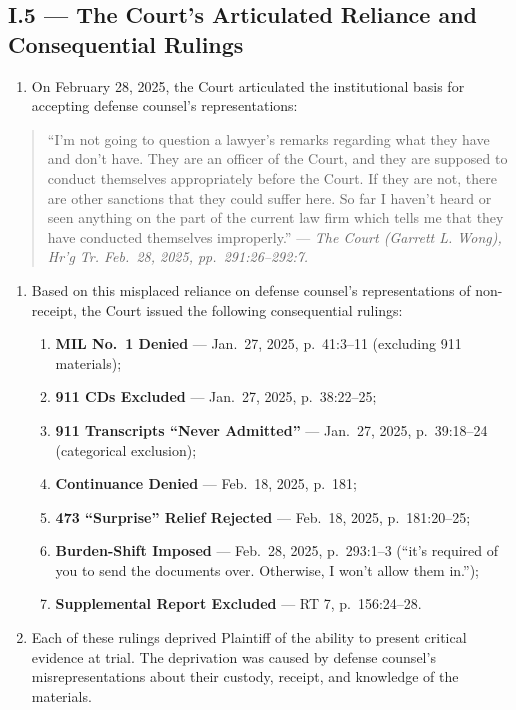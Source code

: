 \subsection{\textsection{}I.5 --- The Court's Articulated Reliance and Consequential Rulings}\label{i.5-the-courts-articulated-reliance-and-consequential-rulings}

\begin{enumerate}
\def\labelenumi{\arabic{enumi}.}
\setcounter{enumi}{3}
\tightlist
\item
  On February 28, 2025, the Court articulated the institutional basis for accepting defense counsel's representations:
\end{enumerate}

\begin{quote}
``I'm not going to question a lawyer's remarks regarding what they have and don't have. They are an officer of the Court, and they are supposed to conduct themselves appropriately before the Court. If they are not, there are other sanctions that they could suffer here. So far I haven't heard or seen anything on the part of the current law firm which tells me that they have conducted themselves improperly.'' --- \emph{The Court (Garrett L. Wong), Hr'g Tr. Feb.~28, 2025, pp.~291:26--292:7.}
\end{quote}

\begin{enumerate}
\def\labelenumi{\arabic{enumi}.}
\setcounter{enumi}{4}
\item
  Based on this misplaced reliance on defense counsel's representations of non-receipt, the Court issued the following consequential rulings:

  \begin{enumerate}
  \def\labelenumii{(\alph{enumii})}
  \item
    \textbf{MIL No.~1 Denied} --- Jan.~27, 2025, p.~41:3--11 (excluding 911 materials);
  \item
    \textbf{911 CDs Excluded} --- Jan.~27, 2025, p.~38:22--25;
  \item
    \textbf{911 Transcripts ``Never Admitted''} --- Jan.~27, 2025, p.~39:18--24 (categorical exclusion);
  \item
    \textbf{Continuance Denied} --- Feb.~18, 2025, p.~181;
  \item
    \textbf{\textsection{} 473 ``Surprise'' Relief Rejected} --- Feb.~18, 2025, p.~181:20--25;
  \item
    \textbf{Burden-Shift Imposed} --- Feb.~28, 2025, p.~293:1--3 (``it's required of you to send the documents over. Otherwise, I won't allow them in.'');
  \item
    \textbf{Supplemental Report Excluded} --- RT 7, p.~156:24--28.
  \end{enumerate}
\item
  Each of these rulings deprived Plaintiff of the ability to present critical evidence at trial. The deprivation was caused by defense counsel's misrepresentations about their custody, receipt, and knowledge of the materials.
\end{enumerate}

